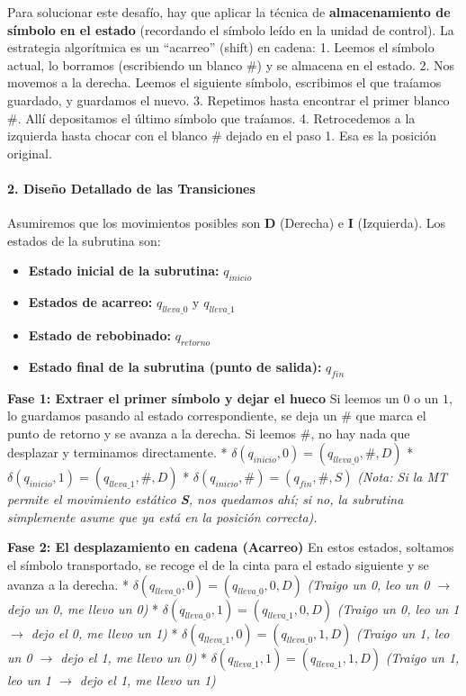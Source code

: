 \documentclass[12pt]{book} %
\providecommand{\tightlist}{%
  \setlength{\itemsep}{0pt}\setlength{\parskip}{0pt}}
\begin{document}
Para solucionar este desafío, hay que aplicar la técnica de
\textbf{almacenamiento de símbolo en el estado} (recordando el símbolo
leído en la unidad de control). La estrategia algorítmica es un
``acarreo'' (shift) en cadena: 1. Leemos el símbolo actual, lo borramos
(escribiendo un blanco \(\#\)) y se almacena en el estado. 2. Nos
movemos a la derecha. Leemos el siguiente símbolo, escribimos el que
traíamos guardado, y guardamos el nuevo. 3. Repetimos hasta encontrar el
primer blanco \(\#\). Allí depositamos el último símbolo que traíamos.
4. Retrocedemos a la izquierda hasta chocar con el blanco \(\#\) dejado
en el paso 1. Esa es la posición original.

\hypertarget{diseuxf1o-detallado-de-las-transiciones}{%
\paragraph{2. Diseño Detallado de las
Transiciones}\label{diseuxf1o-detallado-de-las-transiciones}}

Asumiremos que los movimientos posibles son \textbf{D} (Derecha) e
\textbf{I} (Izquierda). Los estados de la subrutina son:

\begin{itemize}
\tightlist
\item
  \textbf{Estado inicial de la subrutina:} \(q_{inicio}\)
\item
  \textbf{Estados de acarreo:} \(q_{lleva\_0}\) y \(q_{lleva\_1}\)
\item
  \textbf{Estado de rebobinado:} \(q_{retorno}\)
\item
  \textbf{Estado final de la subrutina (punto de salida):} \(q_{fin}\)
\end{itemize}

\textbf{Fase 1: Extraer el primer símbolo y dejar el hueco} Si leemos un
\(0\) o un \(1\), lo guardamos pasando al estado correspondiente, se
deja un \(\#\) que marca el punto de retorno y se avanza a la derecha.
Si leemos \(\#\), no hay nada que desplazar y terminamos directamente. *
\(\delta(q_{inicio}, 0) = (q_{lleva\_0}, \#, D)\) *
\(\delta(q_{inicio}, 1) = (q_{lleva\_1}, \#, D)\) *
\(\delta(q_{inicio}, \#) = (q_{fin}, \#, S)\) \emph{(Nota: Si la MT
permite el movimiento estático \textbf{S}, nos quedamos ahí; si no, la
subrutina simplemente asume que ya está en la posición correcta).}

\textbf{Fase 2: El desplazamiento en cadena (Acarreo)} En estos estados,
soltamos el símbolo transportado, se recoge el de la cinta para el
estado siguiente y se avanza a la derecha. *
\(\delta(q_{lleva\_0}, 0) = (q_{lleva\_0}, 0, D)\) \emph{(Traigo un 0,
leo un 0 \(\rightarrow\) dejo un 0, me llevo un 0)} *
\(\delta(q_{lleva\_0}, 1) = (q_{lleva\_1}, 0, D)\) \emph{(Traigo un 0,
leo un 1 \(\rightarrow\) dejo el 0, me llevo un 1)} *
\(\delta(q_{lleva\_1}, 0) = (q_{lleva\_0}, 1, D)\) \emph{(Traigo un 1,
leo un 0 \(\rightarrow\) dejo el 1, me llevo un 0)} *
\(\delta(q_{lleva\_1}, 1) = (q_{lleva\_1}, 1, D)\) \emph{(Traigo un 1,
leo un 1 \(\rightarrow\) dejo el 1, me llevo un 1)}
\end{document}

